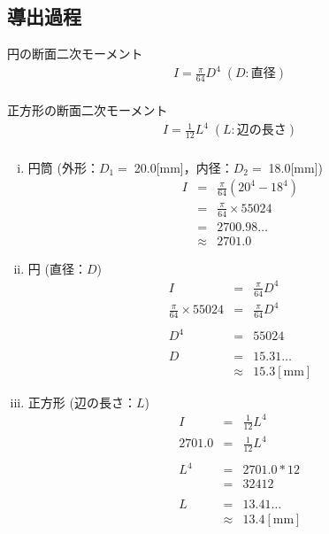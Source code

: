 \documentclass[twocolumn,a4j]{jsarticle}
\begin{document}
\subsection{導出過程}
    \begin{itembox}[l]{円の断面二次モーメント}
        \begin{eqnarray*}
            I = \frac{\pi}{64}D^4\;\left(D:直径\right)\\
        \end{eqnarray*}
    \end{itembox}
    \begin{itembox}[l]{正方形の断面二次モーメント}
        \begin{eqnarray*}
            I = \frac{1}{12}L^4\;\left(L:辺の長さ\right)\\
        \end{eqnarray*}
    \end{itembox}
    \par
    \begin{enumerate}[(i)]
        \item 円筒 (外形：$D_1=\;$20.0[mm]，内径：$D_2=\;$18.0[mm])
        \begin{eqnarray*}
            I &=& \frac{\pi}{64} \left(20^4 - 18^4\right)\\
            &=& \frac{\pi}{64} × 55024\\
            &=& 2700.98 \dots\\
            &\approx& 2701.0
        \end{eqnarray*}
        \item 円 (直径：$D$)
        \begin{eqnarray*}
            I &=& \frac{\pi}{64}D^4\\
            \frac{\pi}{64} × 55024 &=& \frac{\pi}{64}D^4\\
            \\
            D^4 &=& 55024\\
            \\
            D&=& 15.31\dots\\
            &\approx& 15.3 \left[\mathrm{mm}\right]
        \end{eqnarray*}
        \item 正方形 (辺の長さ：$L$)
        \begin{eqnarray*}
            I &=& \frac{1}{12}L^4\\
            2701.0 &=& \frac{1}{12}L^4\\
            \\
            L^4 &=& 2701.0 * 12\\
            &=& 32412\\
            \\
            L&=& 13.41\dots\\
            &\approx& 13.4 \left[\mathrm{mm}\right]
        \end{eqnarray*}
    \end{enumerate}
\end{document}
